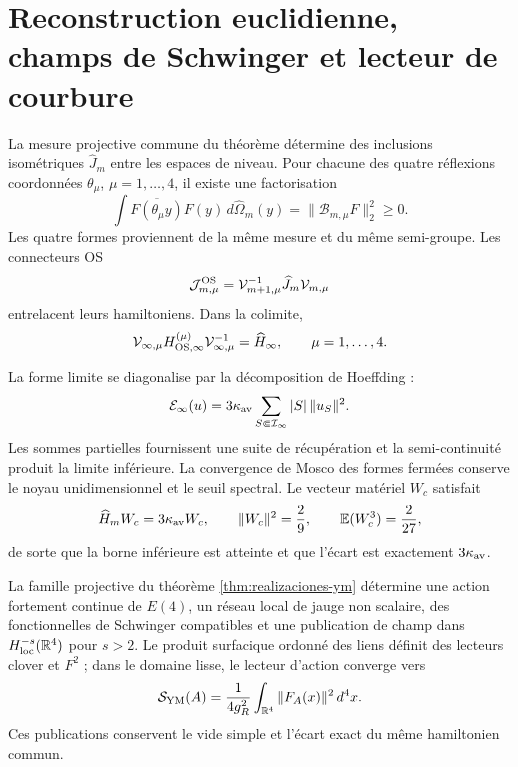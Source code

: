 \section*{Reconstruction euclidienne, champs de Schwinger et lecteur de courbure}

La mesure projective commune du théorème détermine des inclusions isométriques
\(\widehat J_m\) entre les espaces de niveau. Pour chacune des quatre
réflexions coordonnées \(\theta_\mu\), \(\mu=1,\ldots,4\), il existe une
factorisation
\begin{equation}\label{eq:amp-ym-cuatro-os}
 \int\overline{F(\theta_\mu y)}F(y)\,
 d\widehat\Omega_m(y)
 =\|\mathcal B_{m,\mu}F\|_2^2\geq0.
\end{equation}
Les quatre formes proviennent de la même mesure et du même semi-groupe. Les
connecteurs OS
\[
 \mathcal J_{m,\mu}^{\rm OS}
 =\mathcal V_{m+1,\mu}^{-1}\widehat J_m\mathcal V_{m,\mu}
\]
entrelacent leurs hamiltoniens. Dans la colimite,
\begin{equation}\label{eq:amp-ym-hamiltoniano-comun}
 \mathcal V_{\infty,\mu}H_{{\rm OS},\infty}^{(\mu)}
 \mathcal V_{\infty,\mu}^{-1}
 =\widehat H_\infty,
 \qquad \mu=1,\ldots,4.
\end{equation}

La forme limite se diagonalise par la décomposition de Hoeffding :
\begin{equation}\label{eq:amp-ym-forma-limite}
 \mathcal E_\infty(u)=3\kappa_{\rm av}
 \sum_{S\Subset\mathcal I_\infty}|S|\,\|u_S\|^2.
\end{equation}
Les sommes partielles fournissent une suite de récupération et la semi-continuité produit la limite inférieure. La convergence de Mosco des formes fermées conserve le noyau unidimensionnel et le seuil spectral. Le vecteur matériel \(W_c\) satisfait
\begin{equation}\label{eq:amp-ym-testigo-gap}
 \widehat H_mW_c=3\kappa_{\rm av}W_c,
 \qquad \|W_c\|^2=\frac29,
 \qquad \mathbb E(W_c^3)=\frac2{27},
\end{equation}
de sorte que la borne inférieure est atteinte et que l’écart est exactement
\(3\kappa_{\rm av}\).

\begin{theorem}
\label{thm:amp-ym-terminacion}
La famille projective du théorème \ref{thm:realizaciones-ym} détermine une
action fortement continue de \(E(4)\), un réseau local de jauge non scalaire,
des fonctionnelles de Schwinger compatibles et une publication de champ dans
\(H^{-s}_{\rm loc}(\mathbb R^4)\) pour \(s>2\). Le produit surfacique
ordonné des liens définit des lecteurs clover et \(F^2\) ; dans le domaine
lisse, le lecteur d’action converge vers
\begin{equation}\label{eq:amp-ym-f2}
 \mathcal S_{\rm YM}(A)
 =\frac1{4g_R^2}\int_{\mathbb R^4}\|F_A(x)\|^2\,d^4x.
\end{equation}
Ces publications conservent le vide simple et l’écart exact du même
hamiltonien commun.
\end{theorem}

